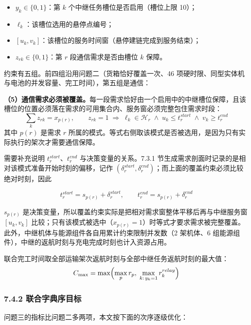 \documentclass[withoutpreface,bwprint]{format}
\begin{document}
\begin{itemize}[leftmargin=*]
    \item $y_k \in \{0,1\}$：第 $k$ 个中继任务槽位是否启用（槽位上限 10）；
    \item $\ell_k$：该槽位选用的悬停点编号；
    \item $[u_k, v_k]$：该槽位的服务时间窗（悬停建链完成到服务结束）；
    \item $z_{rk} \in \{0,1\}$：第 $r$ 段通信需求是否由槽位 $k$ 保障。
\end{itemize}

约束有五组。前四组沿用问题二（货箱恰好覆盖一次、46 项硬时限、同型实体机与电池的并发容量、完工时间），第五组是通信：

\textbf{（5）通信需求必须被覆盖。}每一段需求恰好由一个启用中的中继槽位保障，且该槽位的位置必须落在需求的可用集合内、服务窗必须完整包住需求时段：
\begin{equation}
\sum_{k} z_{rk} = x_{p(r)}, \qquad
z_{rk} = 1 \;\Longrightarrow\; \ell_k \in \mathcal{H}_r \;\wedge\; u_k \le t_r^{start} \;\wedge\; v_k \ge t_r^{end}
\end{equation}
其中 $p(r)$ 是需求 $r$ 所属的模式。等式右侧取该模式是否被选用，是因为只有实际执行的架次才需要通信保障。

需要补充说明 $t_r^{start}$、$t_r^{end}$ 与决策变量的关系。7.3.1 节生成需求剖面时记录的是相对该模式准备开始时刻的偏移，记作 $(\delta_r^{start}, \delta_r^{end})$；而上面的覆盖约束必须比较绝对时刻，因此

\begin{equation}
t_r^{start} = s_{p(r)} + \delta_r^{start}, \qquad t_r^{end} = s_{p(r)} + \delta_r^{end}
\end{equation}

$s_{p(r)}$ 是决策变量，所以覆盖约束实际是把相对需求窗整体平移后再与中继服务窗 $[u_k, v_k]$ 比较；只有该模式被选中（$x_{p(r)} = 1$）时等式才要求需求被完整覆盖。此外，中继机体与能源组件各自用累计约束限制并发数（2 架机体、6 组能源组件），中继的返航时刻与充电完成时刻也计入资源占用。

联合完工时间取全部运输架次返航时刻与全部中继任务返航时刻的最大值：
\begin{equation}
C_{\max} = \max\Bigl(\max_{p} r_p,\; \max_{k:\, y_k = 1} r_k^{relay}\Bigr)
\end{equation}

\subsubsection{7.4.2 联合字典序目标}
问题三的指标比问题二多两项，本文按下面的次序逐级优化：
\end{document}
